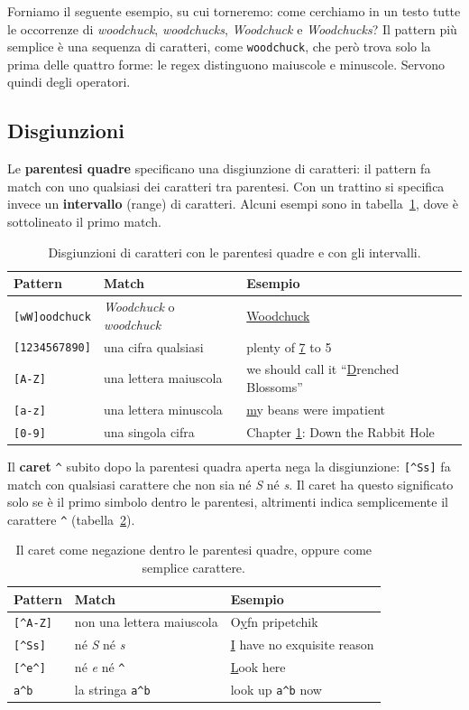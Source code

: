 Forniamo il seguente esempio, su cui torneremo: come cerchiamo in un testo tutte le occorrenze di \textit{woodchuck}, \textit{woodchucks}, \textit{Woodchuck} e \textit{Woodchucks}? Il pattern più semplice è una sequenza di caratteri, come \verb|woodchuck|, che però trova solo la prima delle quattro forme: le regex distinguono maiuscole e minuscole. Servono quindi degli operatori.

\subsection{Disgiunzioni}
Le \textbf{parentesi quadre} specificano una disgiunzione di caratteri: il pattern fa match con uno qualsiasi dei caratteri tra parentesi. Con un trattino si specifica invece un \textbf{intervallo} (range) di caratteri. Alcuni esempi sono in tabella~\ref{tab:regex-disj}, dove è sottolineato il primo match.

\begin{table}[htbp]
\centering
\begin{tabular}{lll}
\toprule
Pattern & Match & Esempio \\
\midrule
\verb|[wW]oodchuck| & \textit{Woodchuck} o \textit{woodchuck} & \underline{Woodchuck} \\
\verb|[1234567890]| & una cifra qualsiasi & plenty of \underline{7} to 5 \\
\verb|[A-Z]| & una lettera maiuscola & we should call it \enquote{\underline{D}renched Blossoms} \\
\verb|[a-z]| & una lettera minuscola & \underline{m}y beans were impatient \\
\verb|[0-9]| & una singola cifra & Chapter \underline{1}: Down the Rabbit Hole \\
\bottomrule
\end{tabular}
\caption{Disgiunzioni di caratteri con le parentesi quadre e con gli intervalli.}
\label{tab:regex-disj}
\end{table}

Il \textbf{caret} \verb|^| subito dopo la parentesi quadra aperta nega la disgiunzione: \verb|[^Ss]| fa match con qualsiasi carattere che non sia né \textit{S} né \textit{s}. Il caret ha questo significato solo se è il primo simbolo dentro le parentesi, altrimenti indica semplicemente il carattere \verb|^| (tabella~\ref{tab:regex-neg}).

\begin{table}[htbp]
\centering
\begin{tabular}{lll}
\toprule
Pattern & Match & Esempio \\
\midrule
\verb|[^A-Z]| & non una lettera maiuscola & O\underline{y}fn pripetchik \\
\verb|[^Ss]| & né \textit{S} né \textit{s} & \underline{I} have no exquisite reason \\
\verb|[^e^]| & né \textit{e} né \verb|^| & \underline{L}ook here \\
\verb|a^b| & la stringa \verb|a^b| & look up \verb|a^b| now \\
\bottomrule
\end{tabular}
\caption{Il caret come negazione dentro le parentesi quadre, oppure come semplice carattere.}
\label{tab:regex-neg}
\end{table}

